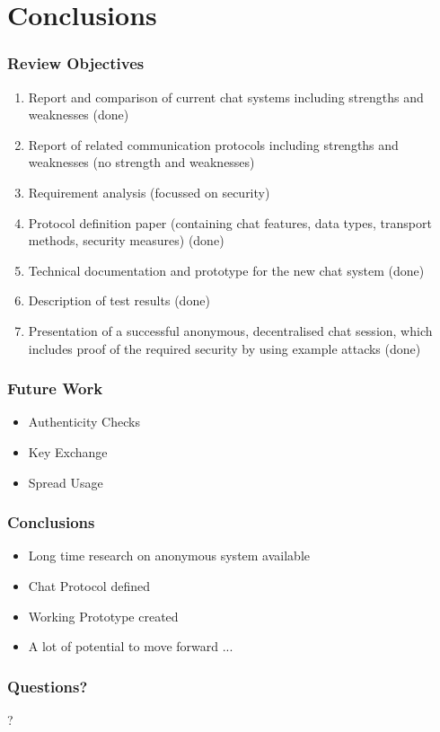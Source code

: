 \documentclass{beamer}
\begin{document}
\section{Conclusions}
\frame
{
  \frametitle{Review Objectives}
\begin{tiny}
\begin{enumerate}
\item Report and comparison of current chat systems including strengths and weaknesses (\alert{done})
\item Report of related communication protocols including strengths and weaknesses (\alert{no strength and weaknesses})
\item Requirement analysis (\alert{focussed on security})
\item Protocol definition paper (containing chat features, data types, transport methods, security measures) (\alert{done})
\item Technical documentation and prototype for the new chat system (\alert{done})
\item Description of test results (\alert{done})
\item Presentation of a successful anonymous, decentralised chat session, which includes proof of the required security by using example attacks (\alert{done})
\end{enumerate}
\end{tiny}

}

\frame
{
  \frametitle{Future Work}
  \begin{itemize}
    \item Authenticity Checks
    \item Key Exchange
    \item Spread Usage
  \end{itemize}
}

\frame
{
  \frametitle{Conclusions}
  \begin{itemize}
    \item Long time research on anonymous system available
    \item Chat Protocol defined
    \item Working Prototype created
    \item A lot of potential to move forward ...
  \end{itemize}
}

\frame
{
  \frametitle{Questions?}
  \begin{center}
  ?
  \end{center}
}
\end{document}
